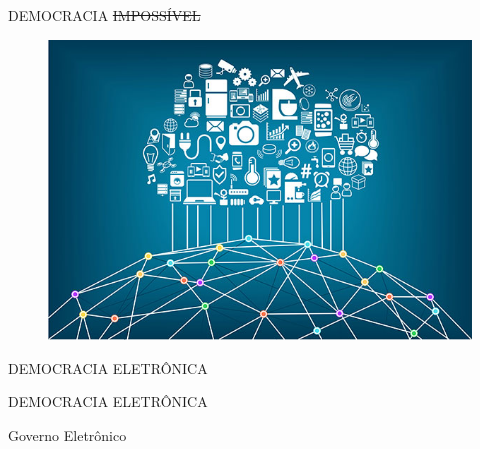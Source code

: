 \documentclass{Alexandre}
\begin{document}
\begin{frame}{DEMOCRACIA \sout{IMPOSSÍVEL}}

    \begin{figure}
        \includegraphics[scale = 0.40]{Figuras/Internet.jpg}
    \end{figure}

\end{frame}


\begin{frame}{DEMOCRACIA ELETRÔNICA}

\end{frame}


\begin{frame}{DEMOCRACIA ELETRÔNICA}

    \begin{center}
        Governo Eletrônico
    \end{center}
    \vspace{3cm}

\end{frame}
\end{document}
